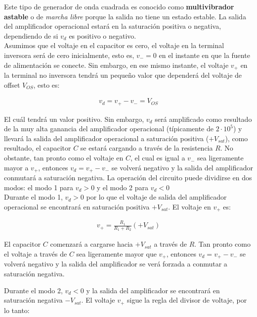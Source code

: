 \documentclass{article}
\begin{document}
\noindent Este tipo de generador de onda cuadrada es conocido como \textbf{multivibrador astable} o de \textit{marcha libre} porque la salida no tiene un estado estable. La salida del amplificador operacional estará en la saturación positiva o negativa, dependiendo de si $v_d$ es positivo o negativo. \\

\noindent Asumimos que el voltaje en el capacitor es cero, el voltaje en la terminal inversora será de cero inicialmente, esto es, $v_{-} = 0$ en el instante en que la fuente de alimentación se conecte. Sin embargo, en ese mismo instante, el voltaje $v_{+}$ en la terminal no inversora tendrá un pequeño valor que dependerá del voltaje de offset $V_{OS}$, esto es:

\begin{align}
	v_d = v_{+} - v_{-} = V_{OS}
\end{align}

El cuál tendrá un valor positivo. Sin embargo, $v_d$ será amplificado como resultado de la muy alta ganancia del amplificador operacional (típicamente de $2 \cdot 10^5$) y llevará la salida del amplificador operacional a saturación positiva ($+V_{sat}$), como resultado, el capacitor $C$ se estará cargando a través de la resistencia $R$. No obstante, tan pronto como el voltaje en $C$, el cual es igual a $v_{-}$ sea ligeramente mayor a $v_{+}$, entonces $v_d = v_{+} - v_{-}$ se volverá negativo y la salida del amplificador conmutará a saturación negativa.
La operación del circuito puede dividirse en dos modos: el modo 1 para $v_d > 0$ y el modo 2 para $v_d < 0$ \\

\noindent Durante el modo 1, $v_d > 0$ por lo que el voltaje de salida del amplificador operacional se encontrará en saturación positiva $+V_{sat}$. El voltaje en $v_+$ es:

\begin{align}
	v_{+} = \frac{R_1}{R_1 + R_2}(+V_{sat})
\end{align}

El capacitor $C$ comenzará a cargarse hacia $+V_{sat}$ a través de $R$. Tan pronto como el voltaje a través de $C$ sea ligeramente mayor que $v_{+}$, entonces $v_d = v_{+} - v_{-}$ se volverá negativo y la salida del amplificador se verá forzada a conmutar a saturación negativa.

Durante el modo 2, $v_d < 0$ y la salida del amplificador se encontrará en saturación negativa $-V_{sat}$. El voltaje $v_{+}$ sigue la regla del divisor de voltaje, por lo tanto:
\end{document}
